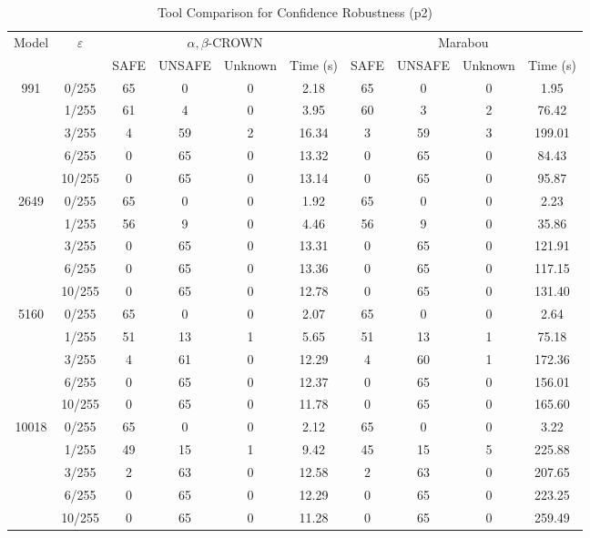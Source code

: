 \begin{table}[htbp]
\centering
\caption{Tool Comparison for Confidence Robustness (p2)}
\label{tab:p2_tool_comparison}
\begin{tabular}{|c|c|c|c|c|c|c|c|c|c|}
\hline
\multirow{2}{*}{Model} & \multirow{2}{*}{$\varepsilon$} & \multicolumn{4}{c|}{$\alpha,\beta$-CROWN} & \multicolumn{4}{c|}{Marabou} \\ \cline{3-10}
 & & SAFE & UNSAFE & Unknown & Time (s) & SAFE & UNSAFE & Unknown & Time (s) \\ \hline
\multirow{5}{*}{991} & 0/255 & 65 & 0 & 0 & 2.18 & 65 & 0 & 0 & 1.95 \\ 
  & 1/255 & 61 & 4 & 0 & 3.95 & 60 & 3 & 2 & 76.42 \\ 
  & 3/255 & 4 & 59 & 2 & 16.34 & 3 & 59 & 3 & 199.01 \\ 
  & 6/255 & 0 & 65 & 0 & 13.32 & 0 & 65 & 0 & 84.43 \\ 
  & 10/255 & 0 & 65 & 0 & 13.14 & 0 & 65 & 0 & 95.87 \\ \hline
\hline
\multirow{5}{*}{2649} & 0/255 & 65 & 0 & 0 & 1.92 & 65 & 0 & 0 & 2.23 \\ 
  & 1/255 & 56 & 9 & 0 & 4.46 & 56 & 9 & 0 & 35.86 \\ 
  & 3/255 & 0 & 65 & 0 & 13.31 & 0 & 65 & 0 & 121.91 \\ 
  & 6/255 & 0 & 65 & 0 & 13.36 & 0 & 65 & 0 & 117.15 \\ 
  & 10/255 & 0 & 65 & 0 & 12.78 & 0 & 65 & 0 & 131.40 \\ \hline
\hline
\multirow{5}{*}{5160} & 0/255 & 65 & 0 & 0 & 2.07 & 65 & 0 & 0 & 2.64 \\ 
  & 1/255 & 51 & 13 & 1 & 5.65 & 51 & 13 & 1 & 75.18 \\ 
  & 3/255 & 4 & 61 & 0 & 12.29 & 4 & 60 & 1 & 172.36 \\ 
  & 6/255 & 0 & 65 & 0 & 12.37 & 0 & 65 & 0 & 156.01 \\ 
  & 10/255 & 0 & 65 & 0 & 11.78 & 0 & 65 & 0 & 165.60 \\ \hline
\hline
\multirow{5}{*}{10018} & 0/255 & 65 & 0 & 0 & 2.12 & 65 & 0 & 0 & 3.22 \\ 
  & 1/255 & 49 & 15 & 1 & 9.42 & 45 & 15 & 5 & 225.88 \\ 
  & 3/255 & 2 & 63 & 0 & 12.58 & 2 & 63 & 0 & 207.65 \\ 
  & 6/255 & 0 & 65 & 0 & 12.29 & 0 & 65 & 0 & 223.25 \\ 
  & 10/255 & 0 & 65 & 0 & 11.28 & 0 & 65 & 0 & 259.49 \\ 
\hline
\end{tabular}
\end{table}
